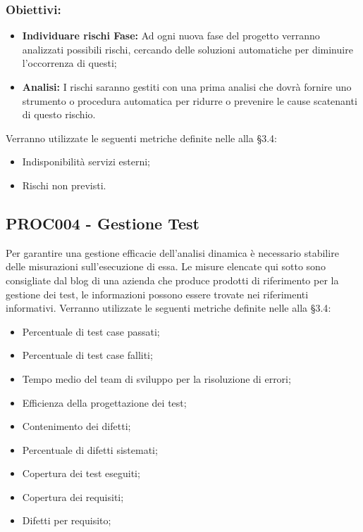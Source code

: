 \documentclass[PianoDiQualifica.tex]{subfiles}
\begin{document}
\subsubsection{Obiettivi:}
\begin{itemize}
	\item \textbf{Individuare rischi Fase:} Ad ogni nuova fase del progetto verranno analizzati possibili rischi, cercando delle soluzioni automatiche per diminuire l'occorrenza di questi;
	\item \textbf{Analisi:} I rischi saranno gestiti con una prima analisi che dovrà fornire uno strumento o procedura automatica per ridurre o prevenire le cause scatenanti di questo rischio.
\end{itemize}
Verranno utilizzate le seguenti metriche definite nelle \ndp alla \S{3.4}:
\begin{itemize}
	\item {} Indisponibilità servizi esterni;
	\item {} Rischi non previsti.
\end{itemize}

\subsection{PROC004 - Gestione Test}	
Per garantire una gestione efficacie dell'analisi dinamica è necessario stabilire delle misurazioni sull'esecuzione di essa.
Le misure elencate qui sotto sono consigliate dal blog di una azienda che produce prodotti di riferimento per la gestione dei test, le informazioni possono essere trovate nei riferimenti informativi.
Verranno utilizzate le seguenti metriche definite nelle \ndp alla \S{3.4}:
\begin{itemize}
	\item {} Percentuale di test case passati;
	\item {} Percentuale di test case falliti;
	\item {} Tempo medio del team di sviluppo per la risoluzione di errori;
	\item {} Efficienza della progettazione dei test;
	\item {} Contenimento dei difetti;
	\item {} Percentuale di difetti sistemati;
	\item {} Copertura dei test eseguiti;
	\item {} Copertura dei requisiti;
	\item {} Difetti per requisito;	
\end{itemize}
\end{document}
